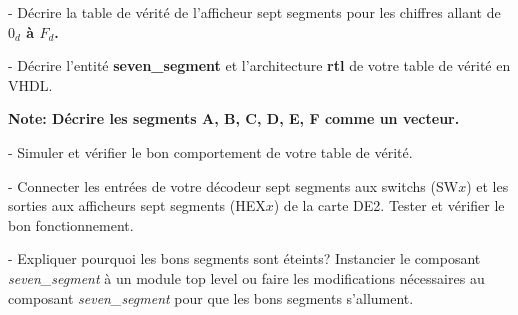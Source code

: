 \medskip

- Décrire la table de vérité de l'afficheur sept segments pour les chiffres allant de \textbf{$0_d$ à $F_d$.}

\medskip

- Décrire l'entité \textbf{seven\_segment} et l'architecture \textbf{rtl} de votre table de vérité en VHDL. 

\textbf{Note: Décrire les segments A, B, C, D, E, F comme un vecteur.}

\medskip

- Simuler et vérifier le bon comportement de votre table de vérité.

\medskip

- Connecter les entrées de votre décodeur sept segments aux switchs (SW$x$) et les sorties aux afficheurs sept segments (HEX$x$) de la carte DE2. Tester et vérifier le bon fonctionnement.

\medskip

- Expliquer pourquoi les bons segments sont éteints? Instancier le composant \textit{seven\_segment} à un module top level ou faire les modifications nécessaires au composant \textit{seven\_segment} pour que les bons segments s'allument.
